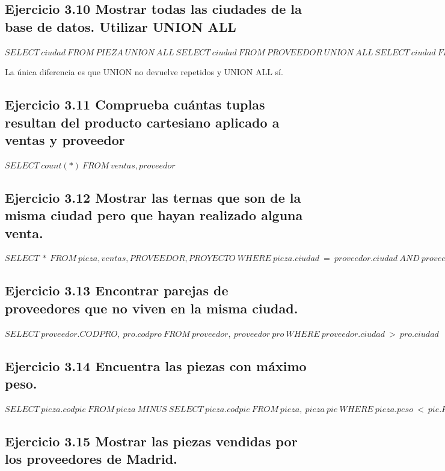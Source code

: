 \documentclass[a4paper, 11pt]{article}
\begin{document}
\subsection{Ejercicio 3.10 Mostrar todas las ciudades de la base de datos. Utilizar UNION ALL}
$SELECT\ ciudad\ FROM\ PIEZA\ UNION\ ALL\ SELECT\ ciudad\ FROM\ PROVEEDOR\ UNION\ ALL\ SELECT\ ciudad\ FROM\ proyecto $

La única diferencia es que UNION no devuelve repetidos y UNION ALL sí.

\subsection{Ejercicio 3.11 Comprueba cuántas tuplas resultan del producto cartesiano aplicado a ventas
	y proveedor}

$SELECT\ count(*)\ FROM\ ventas,proveedor$

\subsection{Ejercicio 3.12 Mostrar las ternas que son de la misma ciudad pero que hayan realizado
	alguna venta.}
$SELECT\ *\ FROM\ pieza,ventas,PROVEEDOR,PROYECTO\ WHERE\ pieza.ciudad\ =\ proveedor.ciudad\ AND\ proveedor.ciudad\ =\ proyecto.ciudad\ AND\ ventas.CODPRO\ =\ proveedor.codpro\ AND\ ventas.codpie\ =\ pieza.codpie\ AND\ ventas.CODPJ\ =\ proyecto.codp$

\subsection{Ejercicio 3.13 Encontrar parejas de proveedores que no viven en la misma ciudad.}
$SELECT\ proveedor.CODPRO,\ pro.codpro\ FROM\ proveedor,\ proveedor\ pro\ WHERE\ proveedor.ciudad\ >\ pro.ciudad$

\subsection{Ejercicio 3.14 Encuentra las piezas con máximo peso.}

$
SELECT\ pieza.codpie\ FROM\ pieza\ MINUS\ SELECT\ pieza.codpie\ FROM\ pieza,\ pieza\ pie\ WHERE\ pieza.peso\ <\ pie.PESO$

\subsection{Ejercicio 3.15 Mostrar las piezas vendidas por los proveedores de Madrid.}
\end{document}
